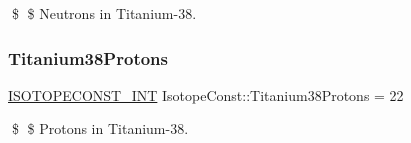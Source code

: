 \$ \$ Neutrons in Titanium-\/38. \mbox{\label{group___isotope_const-_titanium-_ti38_ga61b43cb51b642021299aba7010a537d5}} 
\subsubsection{\texorpdfstring{Titanium38\+Protons}{Titanium38Protons}}
{\footnotesize\ttfamily \mbox{\hyperlink{group___isotope_const-_macros_ga5f18360b3e99483a35c32d789e62621c}{I\+S\+O\+T\+O\+P\+E\+C\+O\+N\+S\+T\+\_\+\+I\+NT}} Isotope\+Const\+::\+Titanium38\+Protons = 22}

\$ \$ Protons in Titanium-\/38. 